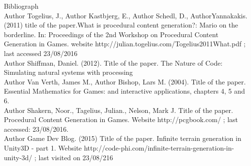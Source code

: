 \documentclass[a4paper,12pt]{book}
\begin{document}


Bibliograph\\


Author Togelius, J., Author Kastbjerg, E., Author Schedl, D., AuthorYannakakis. (2011) title of the paper.What is procedural content generation?: Mario on the borderline. In: Proceedings of the 2nd Workshop on Procedural Content Generation in Games. website   http://julian.togelius.com/Togelius2011What.pdf ; last accessed 23/08/2016 \\

Author Shiffman, Daniel. (2012). Title of the paper. The Nature of Code: Simulating natural systems with processing \\

Author Van Verth, James M., Author Bishop, Lars M. (2004). Title of the paper. Essential Mathematics for Games: and interactive applications, chapters 4, 5 and 6.\\

Author Shakern, Noor., Tagelius, Julian., Nelson, Mark J. Title of the paper. Procedural Content Generation in Games. Website http://pcgbook.com/ ; last accessed: 23/08/2016.\\

Author Game Dev Blog. (2015) Title of the paper. Infinite terrain generation in Unity3D - part 1. Website http://code-phi.com/infinite-terrain-generation-in-unity-3d/ ; last visited on 23/08/216\\
\end{document}
